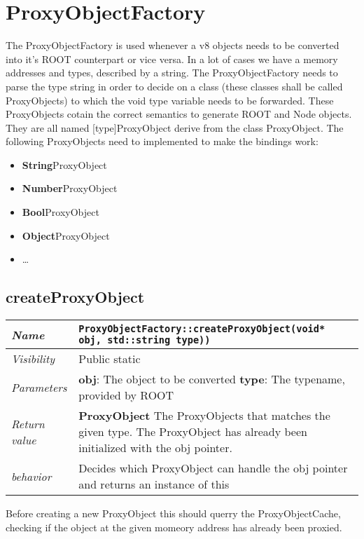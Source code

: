 \chapter{ProxyObjectFactory}
The ProxyObjectFactory is used whenever a v8 objects needs to be converted into it's ROOT counterpart or vice versa.
In a lot of cases we have a memory addresses and types, described by a string. The ProxyObjectFactory needs to parse the type string in order to decide on a class (these classes shall be called ProxyObjects) to which the void type variable needs to be forwarded.
These ProxyObjects cotain the correct semantics to generate ROOT and Node objects. They are all named [type]ProxyObject derive from the class ProxyObject.
The following ProxyObjects need to implemented to make the bindings work:
\begin{itemize}
  \item \textbf{String}ProxyObject
  \item \textbf{Number}ProxyObject
  \item \textbf{Bool}ProxyObject
  \item \textbf{Object}ProxyObject
  \item \dots
\end{itemize}
\section{createProxyObject}
\begin{longtable}{p{3cm} @{\hskip 1cm} p{12cm}}
  \hline
  \textit{Name} & \texttt{ProxyObjectFactory::createProxyObject(void* obj, std::string type))} \\
  \hline
  \textit{Visibility} & Public static \\
  \hline
  \textit{Parameters} & \textbf{obj}: The object to be converted
   \textbf{type}: The typename, provided by ROOT \\
  \hline
  \textit{Return value} & \textbf{ProxyObject} The ProxyObjects that matches the given type. The ProxyObject has already been initialized with the obj pointer. \\
  \hline
  \textit{behavior} & Decides which ProxyObject can handle the obj pointer and returns an instance of this \\
  \hline
\end{longtable}
Before creating a new ProxyObject this should querry the ProxyObjectCache, checking if the object at the given momeory address has already been proxied.
